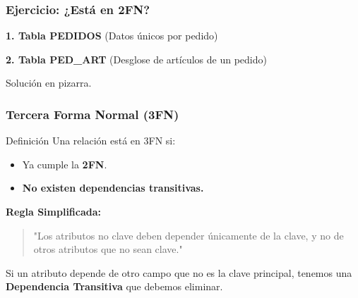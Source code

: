\documentclass{beamer}
\begin{document}
\begin{frame}
\frametitle{Ejercicio: ¿Está en 2FN?}
  \textbf{1. Tabla PEDIDOS} (Datos únicos por pedido)
  \begin{center}
  \end{center}

  \textbf{2. Tabla PED\_ART} (Desglose de artículos de un pedido)
  \begin{center}
  \end{center}
  \tiny{Solución en pizarra.}
  
\end{frame}
\begin{frame}
  \frametitle{Tercera Forma Normal (3FN)}

  \begin{alertblock}{Definición}
    Una relación está en 3FN si:
    \begin{itemize}
        \item Ya cumple la \textbf{2FN}.
        \item \textbf{No existen dependencias transitivas.}
    \end{itemize}
  \end{alertblock}

  \vspace{1em}
  \textbf{Regla Simplificada:}
  \begin{quote}
      "Los atributos no clave deben depender únicamente de la clave, y no de otros atributos que no sean clave."
  \end{quote}
  
  \small{Si un atributo depende de otro campo que no es la clave principal, tenemos una \textbf{Dependencia Transitiva} que debemos eliminar.}
\end{frame}
\end{document}
